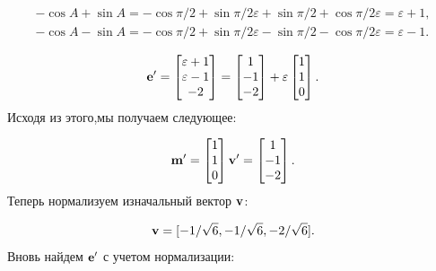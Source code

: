 \begin{align*}
    - \cos A + \sin A = - \cos \pi /2 + \sin \pi /2 \varepsilon + \sin \pi /2 + \cos \pi /2 \varepsilon = \varepsilon + 1, \\
    - \cos A - \sin A = - \cos \pi /2 + \sin \pi /2 \varepsilon - \sin \pi /2 - \cos \pi /2 \varepsilon = \varepsilon - 1.
\end{align*}

\begin{equation*}
    \vb{e}'= 
    \begin{bmatrix}
        \varepsilon + 1 \\
        \varepsilon - 1 \\
        -2
    \end{bmatrix}
    =
    \begin{bmatrix}
        1 \\
        -1 \\
        -2 
    \end{bmatrix}
    + \varepsilon
    \begin{bmatrix}
        1 \\
        1 \\
        0
    \end{bmatrix}.
\end{equation*}
Исходя из этого,мы получаем следующее:

\begin{equation*}
    \vb{m}'=
    \begin{bmatrix}
        1 \\
        1 \\
        0
    \end{bmatrix}
    \vb{v}'=
    \begin{bmatrix}
        1 \\
        -1 \\
        -2
    \end{bmatrix}.
\end{equation*}
Теперь нормализуем изначальный вектор \(\vb{v}\):

\begin{equation*}
    \vb{v}=[-1/\sqrt{6}, -1/\sqrt{6}, -2/\sqrt{6}].
\end{equation*}
Вновь найдем \(\vb{e}'\) с учетом нормализации:

